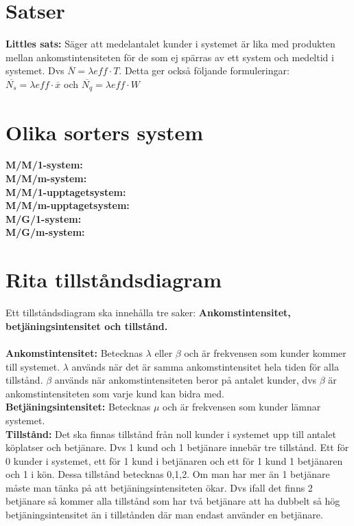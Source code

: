 \documentclass{article}
\begin{document}
	\section*{Satser}
	{ \bf Littles sats:} Säger att medelantalet kunder i systemet är lika med produkten mellan ankomstintensiteten för de som ej spärras av ett system och medeltid i systemet. Dvs $\overline{N}=\lambda{eff}\cdot T$. Detta ger också följande formuleringar:\\
	$\overline{N_s}=\lambda{eff}\cdot \overline{x}$ och $\overline{N_q}=\lambda{eff}\cdot W$
	\section*{Olika sorters system}
	{\bf M/M/1-system:}\\
	{\bf M/M/m-system:}\\
	{\bf M/M/1-upptagetsystem:}\\
	{\bf M/M/m-upptagetsystem:}\\
	{\bf M/G/1-system:}\\
	{\bf M/G/m-system:}\\	
 	\section*{Rita tillståndsdiagram}
	Ett tillståndsdiagram ska innehålla tre saker: {\bf Ankomstintensitet, betjäningsintensitet och tillstånd.}\\\\
	{\bf Ankomstintensitet:} Betecknas $\lambda$ eller $\beta$ och är frekvensen som kunder kommer till systemet. $\lambda$ används när det är samma ankomstintensitet hela tiden för alla tillstånd. $\beta$ används när ankomstintensiteten beror på antalet kunder, dvs $\beta$ är ankomstintensiteten som varje kund kan bidra med.\\
	{\bf Betjäningsintensitet:} Betecknas $\mu$ och är frekvensen som kunder lämnar systemet.\\
	{\bf Tillstånd:} Det ska finnas tillstånd från noll kunder i systemet upp till antalet köplatser och betjänare. Dvs 1 kund och 1 betjänare innebär tre tillstånd. Ett för 0 kunder i systemet, ett för 1 kund i betjänaren och ett för 1 kund 1 betjänaren och 1 i kön. Dessa tillstånd betecknas 0,1,2. Om man har mer än 1 betjänare måste man tänka på att betjäningsintensiteten ökar. Dvs ifall det finns 2 betjänare så kommer alla tillstånd som har två betjänare att ha dubbelt så hög betjäningsintensitet än i tillstånden där man endast använder en betjänare. \\
\end{document}
